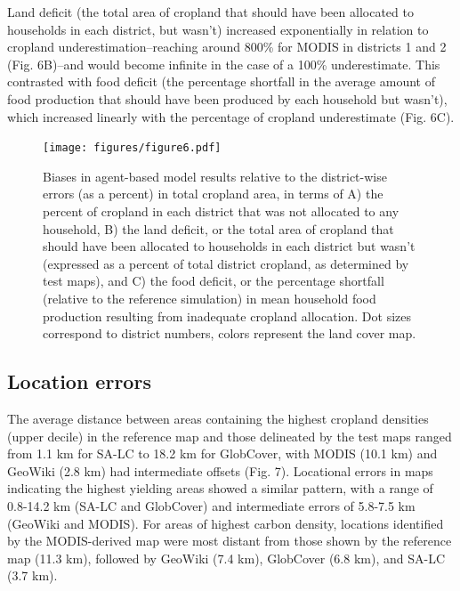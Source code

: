 \documentclass[a4paper]{article}
\begin{document}
Land deficit (the total area of cropland that should have been allocated to households in each district, but wasn't) increased exponentially in relation to cropland underestimation--reaching around 800\% for MODIS in districts 1 and 2 (Fig. 6B)--and would become infinite in the case of a 100\% underestimate. This contrasted with food deficit (the percentage shortfall in the average amount of food production that should have been produced by each household but wasn't), which increased linearly with the percentage of cropland underestimate (Fig. 6C). 


\begin{figure}[ht]
\centerline{\texttt{[image: figures/figure6.pdf]}}
\caption{Biases in agent-based model results relative to the district-wise errors (as a percent) in total cropland area, in terms of A) the percent of cropland in each district that was not allocated to any household, B) the land deficit, or the total area of cropland that should have been allocated to households in each district but wasn't (expressed as a percent of total district cropland, as determined by test maps), and C) the food deficit, or the percentage shortfall (relative to the reference simulation) in mean household food production resulting from inadequate cropland allocation. Dot sizes correspond to district numbers, colors represent the land cover map.}
\label{afoto}
\end{figure}

\vspace{-0.3 cm}
\subsection*{Location errors}
\vspace{-0.2 cm}
The average distance between areas containing the highest cropland densities (upper decile) in the reference map and those delineated by the test maps ranged from 1.1 km for SA-LC to 18.2 km for GlobCover, with MODIS (10.1 km) and GeoWiki (2.8 km) had intermediate offsets (Fig. 7). Locational errors in maps indicating the highest yielding areas showed a similar pattern, with a range of 0.8-14.2 km (SA-LC and GlobCover) and intermediate errors of 5.8-7.5 km (GeoWiki and MODIS). For areas of highest carbon density, locations identified by the MODIS-derived map were most distant from those shown by the reference map (11.3 km), followed by GeoWiki (7.4 km), GlobCover (6.8 km), and SA-LC (3.7 km).   
\end{document}
